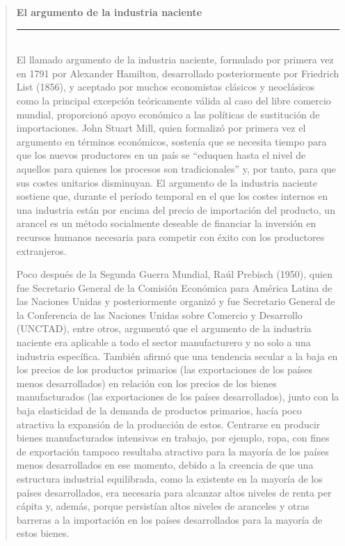\documentclass[10pt,a4paper]{article}
\newenvironment{specialblock}[1]{%
      \begin{quote} %
      \small %
      \noindent\textbf{#1}\\[-0.3em] %
      \rule{\linewidth}{0.4pt}\\[0.6em]}{
      \end{quote}}
\begin{document}
\begin{specialblock}{El argumento de la industria naciente}
    El llamado argumento de la industria naciente, formulado por primera vez en 1791 por Alexander Hamilton, desarrollado posteriormente por Friedrich List (1856), y aceptado por muchos economistas clásicos y neoclásicos como la principal excepción teóricamente válida al caso del libre comercio mundial, proporcionó apoyo económico a las políticas de sustitución de importaciones. John Stuart Mill, quien formalizó por primera vez el argumento en términos económicos, sostenía que se necesita tiempo para que los nuevos productores en un país se “eduquen hasta el nivel de aquellos para quienes los procesos son tradicionales” y, por tanto, para que sus costes unitarios disminuyan. El argumento de la industria naciente sostiene que, durante el período temporal en el que los costes internos en una industria están por encima del precio de importación del producto, un arancel es un método socialmente deseable de financiar la inversión en recursos humanos necesaria para competir con éxito con los productores extranjeros. 
    
    Poco después de la Segunda Guerra Mundial, Raúl Prebisch (1950), quien fue Secretario General de la Comisión Económica para América Latina de las Naciones Unidas y posteriormente organizó y fue Secretario General de la Conferencia de las Naciones Unidas sobre Comercio y Desarrollo (UNCTAD), entre otros, argumentó que el argumento de la industria naciente era aplicable a todo el sector manufacturero y no solo a una industria específica. También afirmó que una tendencia secular a la baja en los precios de los productos primarios (las exportaciones de los países menos desarrollados) en relación con los precios de los bienes manufacturados (las exportaciones de los países desarrollados), junto con la baja elasticidad de la demanda de productos primarios, hacía poco atractiva la expansión de la producción de estos. Centrarse en producir bienes manufacturados intensivos en trabajo, por ejemplo, ropa, con fines de exportación tampoco resultaba atractivo para la mayoría de los países menos desarrollados en ese momento, debido a la creencia de que una estructura industrial equilibrada, como la existente en la mayoría de los países desarrollados, era necesaria para alcanzar altos niveles de renta per cápita y, además, porque persistían altos niveles de aranceles y otras barreras a la importación en los países desarrollados para la mayoría de estos bienes. 
    

\end{specialblock}
\end{document}
